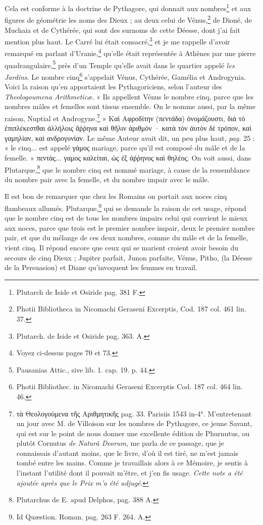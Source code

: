 \documentclass[a4paper, 11pt, oneside, polutonikogreek, french]{article}
\begin{document}
Cela est conforme à la doctrine de Pythagore, qui donnait aux nombres\footnote{Plutarch de Iside et Osiride pag. 381 F.} et aux figures de géométrie les noms des Dieux ; au deux celui de Vénus,\footnote{Photii Bibliotheca in Nicomachi Geraseni Excerptis, Cod. 187 col. 461 lin. 37.} de Dioné, de Muchaia et de Cythérée, qui sont des surnoms de cette Déesse, dont j'ai fait mention plus haut. Le Carré lui était consacré,\footnote{Plutarch. de Iside et Osiride pag. 363. A.} et je me rappelle d'avoir remarqué en parlant d'Uranie,\footnote{Voyez ci-dessus pages 70 et 73.} qu'elle était représentée à Athènes par une pierre quadrangulaire,\footnote{Pausanias Attic., sive lib. 1. cap. 19. p. 44.} près d'un Temple qu'elle avait dans le quartier appelé \emph{les Jardins}. Le nombre cinq\footnote{Photii Bibliothec. in Nicomachi Geraseni Excerptis Cod. 187 col. 464 lin. 46.} s'appelait Vénus, Cythérée, Gamélia et Androgynia. Voici la raison qu'en apportaient les Pythagoriciens, selon l'auteur des \emph{Theologoumena Arithmeticæ}. « Ils appellent Vénus le nombre cinq, parce que les nombres mâles et femelles sont tissus ensemble. On le nomme aussi, par la même raison, Nuptial et Androgyne.\footnote{τὰ Θεολογούμενα τῆς Αριθμητικῆς pag. 33. Parisiis 1543 in-4°. M'entretenant un jour avec M. de Villoison sur les nombres de Pythagore, ce jeune Savant, qui est sur le point de nous donner une excellente édition de Phurnutus, ou plutôt Cornutus \emph{de Naturâ Deorum}, me parla de ce passage, que je connaissais d'autant moins, que le livre, d'où il est tiré, ne m'est jamais tombé entre les mains. Comme je travaillais alors à ce Mémoire, je sentis à l'instant l'utilité dont il pouvait m'être, et j'en fis usage. \emph{Cette note a été ajoutée après que le Prix m'a été adjugé}.} » Καὶ Αφροδίτην (πεντάδα) ὀνομάζουστι, διὰ τὸ ἐπιπλέκεστθαι ἀλλήλοις ἄῤῥηνα καὶ θῆλιν ἀριθμόν · κατὰ τὸν ἀυτὸν δὲ τρόπον, καὶ γαμηλίαν, καὶ ανδρογυνίαν. Le même Auteur avait dit, un peu plus haut, \emph{pag.} 25 : « le cinq... est appelé γάμος mariage, parce qu'il est composé du mâle et de la femelle. » πεντὰς... γαμος καλείται, ὡς ἐξ ἀῤῥηνος καὶ θηλέος. On voit aussi, dans Plutarque,\footnote{Plutarchus de E. apud Delphos, pag. 388 A.} que le nombre cinq est nommé mariage, à cause de la ressemblance du nombre pair avec la femelle, et du nombre impair avec le mâle.

Il est bon de remarquer que chez les Romains on portait aux noces cinq flambeaux allumés. Plutarque,\footnote{Id Quæstion. Roman. pag. 263 F. 264. A.} qui se demande la raison de cet usage, répond que le nombre cinq est de tous les nombres impairs celui qui convient le mieux aux noces, parce que trois est le premier nombre impair, deux le premier nombre pair, et que du mélange de ces deux nombres, comme du mâle et de la femelle, vient cinq. Il répond encore que ceux qui se marient croient avoir besoin du secours de cinq Dieux ; Jupiter parfait, Junon parfaite, Vénus, Pitho, (la Déesse de la Persuasion) et Diane qu'invoquent les femmes en travail.
\end{document}

